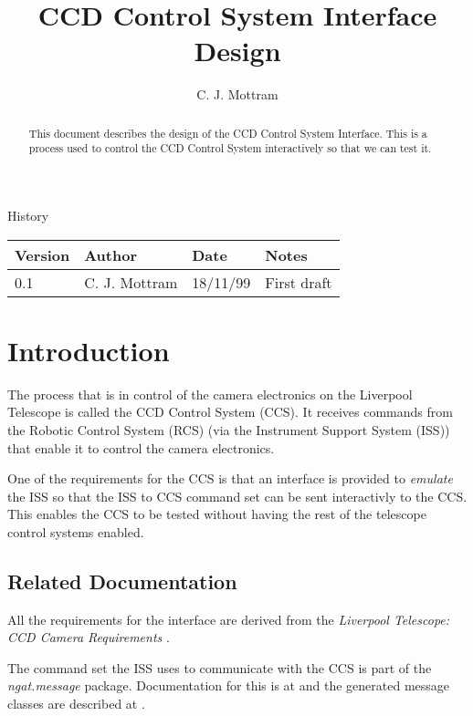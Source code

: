 \documentclass[10pt,a4paper]{article}
\title{CCD Control System Interface Design}
\author{C. J. Mottram}
\date{}
\begin{document}
\thispagestyle{empty}
\maketitle
\begin{abstract}
This document describes the design of the CCD Control System Interface. This is a process
used to control the CCD Control System interactively so that we can test it.
\end{abstract}

\centerline{\Large History}
\begin{center}
\begin{tabular}{|l|l|l|p{15em}|}
\hline
{\bf Version} & {\bf Author} & {\bf Date} & {\bf Notes} \\
\hline
0.1 &              C. J. Mottram & 18/11/99 & First draft \\
\hline
\end{tabular}
\end{center}

\newpage
\tableofcontents
\listoffigures
\listoftables
\newpage

\section{Introduction}
The process that is in control of the camera electronics on the Liverpool Telescope is called the
CCD Control System (CCS). It receives commands from the Robotic Control System (RCS) (via the 
Instrument Support System (ISS)) that enable it to control the camera electronics.

One of the requirements for the CCS is that an interface is provided to
{\em emulate} the ISS so that the ISS to CCS command set can be sent interactivly to the CCS.
This enables the CCS to be tested without having the rest of the telescope control systems enabled.

\subsection{Related Documentation}
All the requirements for the interface are derived from the {\em Liverpool Telescope: CCD
Camera Requirements} \cite{bib:ccdr}.

The command set the ISS uses to communicate with the CCS is part of the {\em ngat.message} package.
Documentation for this is at \cite{bib:messissinst} and the generated message classes are
described at \cite{bib:messageclasses}.
\end{document}
